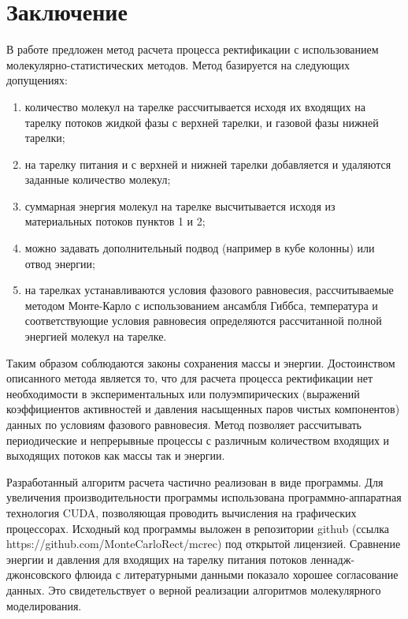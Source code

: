 \section*{Заключение}
В работе предложен метод расчета процесса ректификации с использованием молекулярно-статистических методов. Метод базируется на следующих допущениях:
\begin{enumerate}
	\item количество молекул на тарелке рассчитывается исходя их входящих на тарелку потоков жидкой фазы с верхней тарелки, и газовой фазы нижней тарелки;
	\item на тарелку питания и с верхней и нижней тарелки добавляется и удаляются заданные количество молекул;
	\item суммарная энергия молекул на тарелке высчитывается исходя из материальных потоков пунктов 1 и 2;
	\item можно задавать дополнительный подвод (например в кубе колонны) или отвод энергии;
	\item на тарелках устанавливаются условия фазового равновесия, рассчитываемые методом Монте-Карло с использованием ансамбля Гиббса, температура и соответствующие условия равновесия определяются рассчитанной полной энергией молекул на тарелке.
\end{enumerate}

Таким образом соблюдаются законы сохранения массы и энергии. Достоинством описанного метода является то, что для расчета процесса ректификации нет необходимости в экспериментальных или полуэмпирических (выражений коэффициентов активностей и давления насыщенных паров чистых компонентов) данных по условиям фазового равновесия. Метод позволяет рассчитывать периодические и непрерывные процессы с различным количеством входящих и выходящих потоков как массы так и энергии.

Разработанный алгоритм расчета частично реализован в виде программы. Для увеличения производительности программы использована программно-аппаратная технология CUDA, позволяющая проводить вычисления на графических процессорах. Исходный код программы выложен в репозитории github (ссылка https://github.com/MonteCarloRect/mcrec) под открытой лицензией. Сравнение энергии и давления для входящих на тарелку питания потоков леннадж-джонсовского флюида с литературными данными показало хорошее согласование данных. Это свидетельствует о верной реализации алгоритмов молекулярного моделирования.

